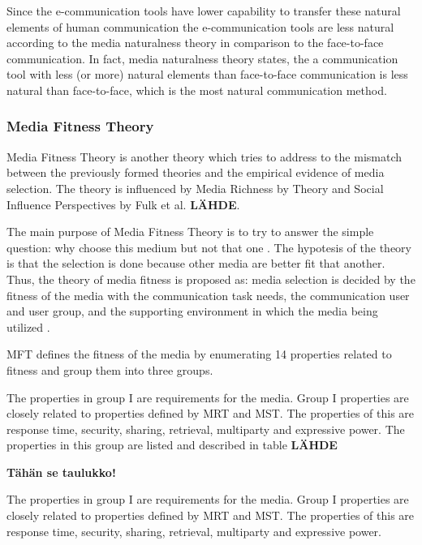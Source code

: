 \documentclass[english,12pt,a4paper,pdftex]{article}
\begin{document}
Since the e-communication tools have lower capability to transfer these natural elements of human communication the e-communication tools are less natural according to the media naturalness theory in comparison to the face-to-face communication. In fact, media naturalness theory states, the a communication tool with less (or more) natural elements than face-to-face communication is less natural than face-to-face, which is the most natural communication method. \citep{kock2005} \citep{kock2004}

\subsubsection{Media Fitness Theory}

Media Fitness Theory is another theory which tries to address to the mismatch between the previously formed theories and the empirical evidence of media selection. The theory is influenced by Media Richness by \citet{daft1986} Theory and Social Influence Perspectives by Fulk et al. \textbf{LÄHDE}.

The main purpose of Media Fitness Theory is to try to answer the simple question: why choose this medium but not that one \citep{higa2007}. The hypotesis of the theory is that the selection is done because other media are better fit that another. Thus, the theory of media fitness is proposed as: media selection is decided by the fitness of the media with the communication task needs, the communication user and user group, and the supporting environment in which the media being utilized \citep{higa2007}.

MFT defines the fitness of the media by enumerating 14 properties related to fitness and group them into three groups. 

The properties in group I are requirements for the media. Group I properties are closely related to properties defined by MRT and MST. The properties of this are response time, security, sharing, retrieval, multiparty and expressive power. The properties in this group are listed and described in table \textbf{LÄHDE}

\textbf{Tähän se taulukko!}

The properties in group I are requirements for the media. Group I properties are closely related to properties defined by MRT and MST. The properties of this are response time, security, sharing, retrieval, multiparty and expressive power.

\citep{higa2007}

\citep{gu2011}
\end{document}
